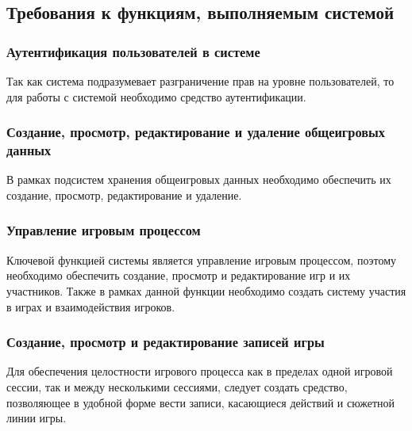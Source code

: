 \subsection{Требования к функциям, выполняемым системой}
\label{sec:specification:functional_requirements}


\subsubsection{Аутентификация пользователей в системе}

Так как система подразумевает разграничение прав на уровне пользователей, то для работы с системой необходимо средство аутентификации.





\subsubsection{Создание, просмотр, редактирование и удаление общеигровых данных}

В рамках подсистем хранения общеигровых данных необходимо обеспечить их создание, просмотр, редактирование и удаление.


\subsubsection{Управление игровым процессом}

Ключевой функцией системы является управление игровым процессом, поэтому необходимо обеспечить создание, просмотр и редактирование игр и их участников. Также в рамках данной функции необходимо создать систему участия в играх и взаимодействия игроков.


\subsubsection{Создание, просмотр и редактирование записей игры}

Для обеспечения целостности игрового процесса как в пределах одной игровой сессии, так и между несколькими сессиями, следует создать средство, позволяющее в удобной форме вести записи, касающиеся действий и сюжетной линии игры.


